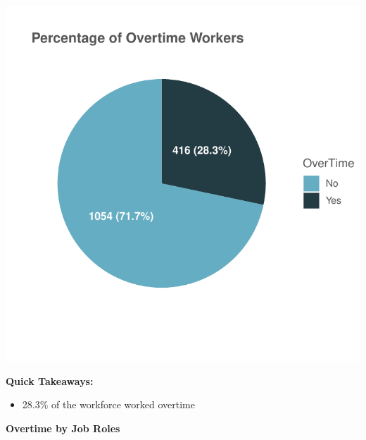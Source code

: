 \documentclass[
]{article}
\providecommand{\tightlist}{%
  \setlength{\itemsep}{0pt}\setlength{\parskip}{0pt}}
\begin{document}
\includegraphics{figures/unnamed-chunk-17-1.pdf}

\textbf{Quick Takeaways:}

\begin{itemize}
\tightlist
\item
  28.3\% of the workforce worked overtime
\end{itemize}

\textbf{Overtime by Job Roles}
\end{document}
